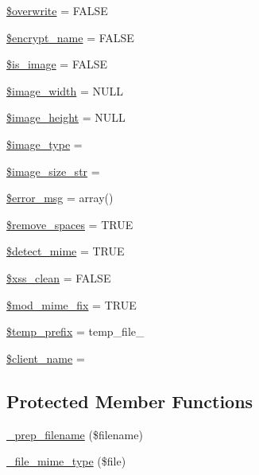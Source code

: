 \begin{DoxyCompactItemize}
\item 
\hyperlink{class_c_i___upload_a8d31b0ad9cccde7e2d857097672ed6cf}{\$overwrite} = F\+A\+L\+S\+E
\item 
\hyperlink{class_c_i___upload_a54a751add0762edd4da11373e3b56687}{\$encrypt\+\_\+name} = F\+A\+L\+S\+E
\item 
\hyperlink{class_c_i___upload_a4dae8ae20ed5fdf406554e1911065753}{\$is\+\_\+image} = F\+A\+L\+S\+E
\item 
\hyperlink{class_c_i___upload_a8dadc2d2dcc0f25529a2d1e080d08169}{\$image\+\_\+width} = N\+U\+L\+L
\item 
\hyperlink{class_c_i___upload_af1b0485025a4c66fa3b2fc442df02d72}{\$image\+\_\+height} = N\+U\+L\+L
\item 
\hyperlink{class_c_i___upload_a939d6733d998cce893403d2f59f40317}{\$image\+\_\+type} = \textquotesingle{}\textquotesingle{}
\item 
\hyperlink{class_c_i___upload_a3a1769072af8ab3b0c5d6e0c1a1ae2ef}{\$image\+\_\+size\+\_\+str} = \textquotesingle{}\textquotesingle{}
\item 
\hyperlink{class_c_i___upload_acf910733622c1fa671b9f755c69c2ec7}{\$error\+\_\+msg} = array()
\item 
\hyperlink{class_c_i___upload_ad9f32a52b4b2c16e42a007e0fa832721}{\$remove\+\_\+spaces} = T\+R\+U\+E
\item 
\hyperlink{class_c_i___upload_a50f6c723a0c96d773ecff982e7117a5f}{\$detect\+\_\+mime} = T\+R\+U\+E
\item 
\hyperlink{class_c_i___upload_a0f2ee8861c0b3164a5c6e126dd98c0cc}{\$xss\+\_\+clean} = F\+A\+L\+S\+E
\item 
\hyperlink{class_c_i___upload_a5f54983a6ad24a5ee5c4ff5d9de48d83}{\$mod\+\_\+mime\+\_\+fix} = T\+R\+U\+E
\item 
\hyperlink{class_c_i___upload_ab38888cba65ae75bbc5b3841bc69d64a}{\$temp\+\_\+prefix} = \textquotesingle{}temp\+\_\+file\+\_\+\textquotesingle{}
\item 
\hyperlink{class_c_i___upload_a3b81ba4d3535269e20e0b4a2ddab2edc}{\$client\+\_\+name} = \textquotesingle{}\textquotesingle{}
\end{DoxyCompactItemize}
\subsection*{Protected Member Functions}
\begin{DoxyCompactItemize}
\item 
\hyperlink{class_c_i___upload_a00936ce870d818794909bf16dc2ff70b}{\+\_\+prep\+\_\+filename} (\$filename)
\item 
\hyperlink{class_c_i___upload_a8ac4511eca70b271965b7f8ef00faf66}{\+\_\+file\+\_\+mime\+\_\+type} (\$file)
\end{DoxyCompactItemize}
